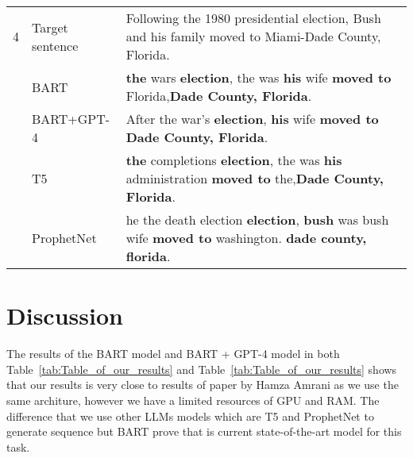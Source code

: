 \documentclass[journal]{IEEEtran}
\begin{document}
\begin{table*}[!htbp]
\begin{tabular}{|p{}|p{}|p{}|}
		4            & Target sentence & Following the 1980 presidential election, Bush and his family moved to Miami-Dade County, Florida.                                                                                                                                                                                                                             \\ \cline{2-3}
		             & BART            & \textbf{the} wars \textbf{election}, the was \textbf{his} wife \textbf{moved to} Florida,\textbf{Dade County, Florida}.                                                                                                                                                                                                        \\ \cline{2-3}
		             & BART+GPT-4      & After the war's \textbf{election}, \textbf{his} wife \textbf{moved to} \textbf{Dade County, Florida}.                                                                                                                                                                                                                          \\ \cline{2-3}
		             & T5              & \textbf{the} completions \textbf{election}, the was \textbf{his} administration \textbf{moved to} the,\textbf{Dade County, Florida}.                                                                                                                                                                                           \\ \cline{2-3}
		             & ProphetNet      & he the death election \textbf{election}, \textbf{bush} was bush wife \textbf{moved to} washington. \textbf{dade county, florida}.                                                                                                                                                                                              \\ \hline
		
	\end{tabular}
\end{table*}

\section{Discussion}


The results of the BART model and BART + GPT-4 model in both Table~\ref{tab:Table_of_our_results} and Table~\ref{tab:Table_of_our_results} shows that our results is very close to results of paper by Hamza Amrani \cite{Amrani} as we use the same architure, however we have a limited resources of GPU and RAM. The difference that we use other LLMs models which are T5 and ProphetNet to generate sequence but BART prove that is current state-of-the-art model for this task.
\end{document}

